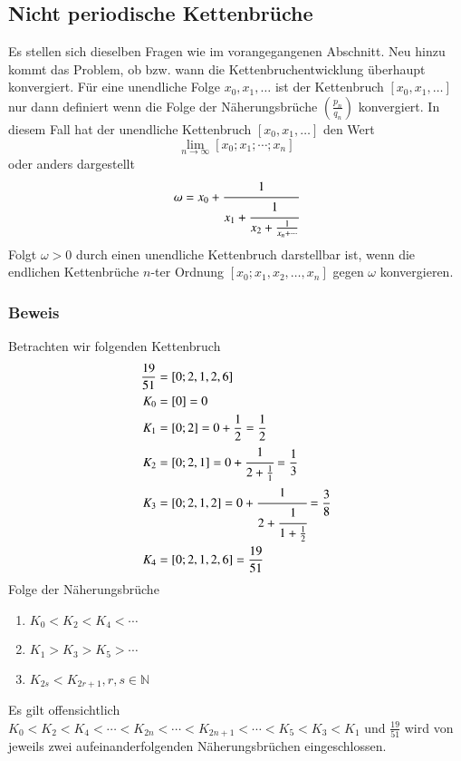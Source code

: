 \subsection{Nicht periodische Kettenbrüche}
Es stellen sich dieselben Fragen wie im vorangegangenen Abschnitt.
Neu hinzu kommt das Problem, ob bzw. wann die Kettenbruchentwicklung
überhaupt konvergiert.
Für eine unendliche Folge $x_0,x_1,\dots$ ist der Kettenbruch
$[x_0,x_1,\dots]$ nur dann definiert wenn die Folge der Näherungsbrüche
$(\frac{p_n}{q_n})$ konvergiert. In diesem Fall hat der unendliche
Kettenbruch $[x_0,x_1,\dots]$ den Wert
\begin{equation}
\lim_{n\to\infty} [x_0;x_1;\cdots;x_n]
\end{equation}
oder anders dargestellt
\begin{equation}
\omega
=
x_0 + \cfrac{1}{x_1+\cfrac{1}{x_2+\frac{1}{x_n+\cdots}}}
\end{equation}
Folgt $\omega > 0$ durch einen unendliche Kettenbruch darstellbar
ist, wenn die endlichen Kettenbrüche $n$-ter Ordnung
$[x_0;x_1,x_2,\dots,x_n]$ gegen $\omega$ konvergieren.

\subsubsection{Beweis}
Betrachten wir folgenden Kettenbruch
\begin{align*}
\frac{19}{51} &= [0;2,1,2,6]
\\
	K_0 &= [0] = 0
\\
	K_1 &= [0;2] = 0 + \frac{1}{2} = \frac{1}{2}
\\
	K_2 &= [0;2,1] = 0 + \cfrac{1}{2+\frac{1}{1}} = \frac{1}{3}
\\
	K_3 &= [0;2,1,2] = 0 + \cfrac{1}{2+\cfrac{1}{1+\frac{1}{2}}} = \frac{3}{8}
\\
	K_4 &= [0;2,1,2,6] = \frac{19}{51}
\end{align*}
Folge der Näherungsbrüche
\begin{enumerate}
\item
$K_0 < K_2 < K_4 < \cdots$
\item
$K_1 > K_3 > K_5 > \cdots$
\item
$K_{2s} < K_{2r+1}, r,s \in \mathbb{N}$
\end{enumerate}

Es gilt offensichtlich
$K_0 < K_2 < K_4 < \cdots < K_{2n} < \cdots < K_{2n+1} < \cdots < K_5
< K_3 < K_1$
und $\frac{19}{51}$ wird von jeweils zwei aufeinanderfolgenden
Näherungsbrüchen eingeschlossen.
 
